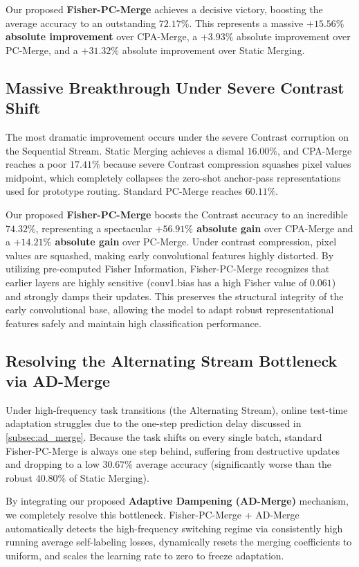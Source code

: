 \documentclass{article}
\theoremstyle{plain}
\theoremstyle{definition}
\theoremstyle{remark}
\begin{document}
Our proposed \textbf{Fisher-PC-Merge} achieves a decisive victory, boosting the average accuracy to an outstanding \textbf{$72.17\%$}. This represents a massive \textbf{$+15.56\%$ absolute improvement} over CPA-Merge, a $+3.93\%$ absolute improvement over PC-Merge, and a $+31.32\%$ absolute improvement over Static Merging.

\subsection{Massive Breakthrough Under Severe Contrast Shift}
The most dramatic improvement occurs under the severe Contrast corruption on the Sequential Stream. Static Merging achieves a dismal $16.00\%$, and CPA-Merge reaches a poor $17.41\%$ because severe Contrast compression squashes pixel values midpoint, which completely collapses the zero-shot anchor-pass representations used for prototype routing. Standard PC-Merge reaches $60.11\%$.

Our proposed \textbf{Fisher-PC-Merge} boosts the Contrast accuracy to an incredible \textbf{$74.32\%$}, representing a spectacular \textbf{$+56.91\%$ absolute gain} over CPA-Merge and a \textbf{$+14.21\%$ absolute gain} over PC-Merge. Under contrast compression, pixel values are squashed, making early convolutional features highly distorted. By utilizing pre-computed Fisher Information, Fisher-PC-Merge recognizes that earlier layers are highly sensitive (conv1.bias has a high Fisher value of $0.061$) and strongly damps their updates. This preserves the structural integrity of the early convolutional base, allowing the model to adapt robust representational features safely and maintain high classification performance.

\subsection{Resolving the Alternating Stream Bottleneck via AD-Merge}
Under high-frequency task transitions (the Alternating Stream), online test-time adaptation struggles due to the one-step prediction delay discussed in \cref{subsec:ad_merge}. Because the task shifts on every single batch, standard Fisher-PC-Merge is always one step behind, suffering from destructive updates and dropping to a low $30.67\%$ average accuracy (significantly worse than the robust $40.80\%$ of Static Merging).

By integrating our proposed \textbf{Adaptive Dampening (AD-Merge)} mechanism, we completely resolve this bottleneck. Fisher-PC-Merge + AD-Merge automatically detects the high-frequency switching regime via consistently high running average self-labeling losses, dynamically resets the merging coefficients to uniform, and scales the learning rate to zero to freeze adaptation. 
\end{document}
